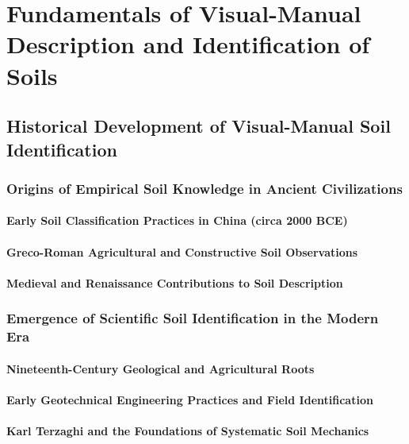 \chapter{Fundamentals of Visual-Manual Description and Identification of Soils}

\section{Historical Development of Visual-Manual Soil Identification}

\subsection{Origins of Empirical Soil Knowledge in Ancient Civilizations}

\subsubsection{Early Soil Classification Practices in China (circa 2000 BCE)}

\subsubsection{Greco-Roman Agricultural and Constructive Soil Observations}

\subsubsection{Medieval and Renaissance Contributions to Soil Description}

\subsection{Emergence of Scientific Soil Identification in the Modern Era}

\subsubsection{Nineteenth-Century Geological and Agricultural Roots}

\subsubsection{Early Geotechnical Engineering Practices and Field Identification}

\subsubsection{Karl Terzaghi and the Foundations of Systematic Soil Mechanics}

